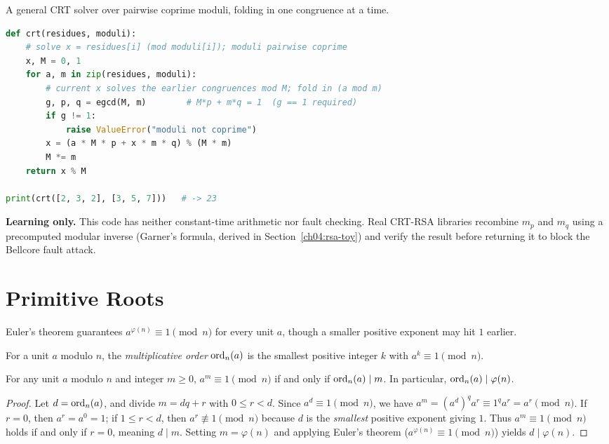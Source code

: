 \begin{implementbox}
A general CRT solver over pairwise coprime moduli, folding in one congruence at a time.

\begin{lstlisting}[language=Python]
def crt(residues, moduli):
    # solve x = residues[i] (mod moduli[i]); moduli pairwise coprime
    x, M = 0, 1
    for a, m in zip(residues, moduli):
        # current x solves the earlier congruences mod M; fold in (a mod m)
        g, p, q = egcd(M, m)        # M*p + m*q = 1  (g == 1 required)
        if g != 1:
            raise ValueError("moduli not coprime")
        x = (a * M * p + x * m * q) % (M * m)
        M *= m
    return x % M

print(crt([2, 3, 2], [3, 5, 7]))   # -> 23
\end{lstlisting}

\textbf{Learning only.} This code has neither constant-time arithmetic nor fault checking. Real
CRT-RSA libraries recombine $m_p$ and $m_q$ using a precomputed modular inverse (Garner's formula,
derived in Section~\ref{ch04:rsa-toy}) and verify the result before returning it to block the
Bellcore fault attack.
\end{implementbox}

\section{Primitive Roots}
\label{ch04:primitive-roots}

Euler's theorem guarantees $a^{\varphi(n)} \equiv 1 \pmod n$ for every unit $a$, though a smaller
positive exponent may hit $1$ earlier.

\begin{definition}
\label{ch04:def-order}
For a unit $a$ modulo $n$, the \emph{multiplicative order} $\operatorname{ord}_n(a)$ is the smallest positive
integer $k$ with $a^k \equiv 1 \pmod n$.
\end{definition}

\begin{lemma}
\label{ch04:lem-order-divides}
For any unit $a$ modulo $n$ and integer $m \ge 0$, $a^m \equiv 1 \pmod n$ if and only if
$\operatorname{ord}_n(a) \mid m$. In particular, $\operatorname{ord}_n(a) \mid \varphi(n)$.
\end{lemma}

\begin{proof}
Let $d = \operatorname{ord}_n(a)$, and divide $m = dq + r$ with $0 \le r < d$. Since $a^d \equiv 1 \pmod n$, we
have $a^m = (a^d)^q a^r \equiv 1^q a^r = a^r \pmod n$. If $r = 0$, then $a^r = a^0 = 1$; if
$1 \le r < d$, then $a^r \not\equiv 1 \pmod n$ because $d$ is the \emph{smallest} positive exponent
giving $1$. Thus $a^m \equiv 1 \pmod n$ holds if and only if $r = 0$, meaning $d \mid m$. Setting
$m = \varphi(n)$ and applying Euler's theorem ($a^{\varphi(n)} \equiv 1 \pmod n$) yields
$d \mid \varphi(n)$.
\end{proof}

